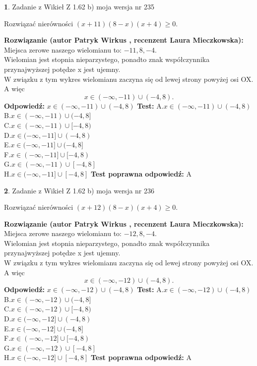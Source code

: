 \documentclass[12pt, a4paper]{article}
\theoremstyle{definition} %
\newtheorem{zad}{}
\newcommand{\zadStart}[1]{\begin{zad}#1\newline}
\newcommand{\zadStop}{\end{zad}}
\newcommand{\rozwStart}[2]{\noindent \textbf{Rozwiązanie (autor #1 , recenzent #2): }\newline}
\newcommand{\rozwStop}{\newline}
\newcommand{\odpStart}{\noindent \textbf{Odpowiedź:}\newline}
\newcommand{\odpStop}{\newline}
\newcommand{\testStart}{\noindent \textbf{Test:}\newline}
\newcommand{\testStop}{\newline}
\newcommand{\kluczStart}{\noindent \textbf{Test poprawna odpowiedź:}\newline}
\newcommand{\kluczStop}{\newline}
\begin{document}
\zadStart{Zadanie z Wikieł Z 1.62 b) moja wersja nr 235}

Rozwiązać nierówności $(x+11)(8-x)(x+4)\ge0$.
\zadStop
\rozwStart{Patryk Wirkus}{Laura Mieczkowska}
Miejsca zerowe naszego wielomianu to: $-11, 8, -4$.\\
Wielomian jest stopnia nieparzystego, ponadto znak współczynnika przy\linebreak najwyższej potędze x jest ujemny.\\ W związku z tym wykres wielomianu zaczyna się od lewej strony powyżej osi OX. A więc $$x \in (-\infty,-11) \cup (-4,8).$$
\rozwStop
\odpStart
$x \in (-\infty,-11) \cup (-4,8)$
\odpStop
\testStart
A.$x \in (-\infty,-11) \cup (-4,8)$\\
B.$x \in (-\infty,-11) \cup (-4,8]$\\
C.$x \in (-\infty,-11) \cup [-4,8)$\\
D.$x \in (-\infty,-11] \cup (-4,8)$\\
E.$x \in (-\infty,-11] \cup (-4,8]$\\
F.$x \in (-\infty,-11] \cup [-4,8)$\\
G.$x \in (-\infty,-11) \cup [-4,8]$\\
H.$x \in (-\infty,-11] \cup [-4,8]$
\testStop
\kluczStart
A
\kluczStop



\zadStart{Zadanie z Wikieł Z 1.62 b) moja wersja nr 236}

Rozwiązać nierówności $(x+12)(8-x)(x+4)\ge0$.
\zadStop
\rozwStart{Patryk Wirkus}{Laura Mieczkowska}
Miejsca zerowe naszego wielomianu to: $-12, 8, -4$.\\
Wielomian jest stopnia nieparzystego, ponadto znak współczynnika przy\linebreak najwyższej potędze x jest ujemny.\\ W związku z tym wykres wielomianu zaczyna się od lewej strony powyżej osi OX. A więc $$x \in (-\infty,-12) \cup (-4,8).$$
\rozwStop
\odpStart
$x \in (-\infty,-12) \cup (-4,8)$
\odpStop
\testStart
A.$x \in (-\infty,-12) \cup (-4,8)$\\
B.$x \in (-\infty,-12) \cup (-4,8]$\\
C.$x \in (-\infty,-12) \cup [-4,8)$\\
D.$x \in (-\infty,-12] \cup (-4,8)$\\
E.$x \in (-\infty,-12] \cup (-4,8]$\\
F.$x \in (-\infty,-12] \cup [-4,8)$\\
G.$x \in (-\infty,-12) \cup [-4,8]$\\
H.$x \in (-\infty,-12] \cup [-4,8]$
\testStop
\kluczStart
A
\kluczStop
\end{document}

